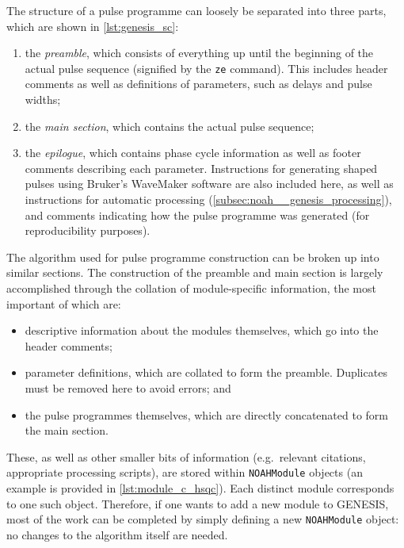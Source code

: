 The structure of a pulse programme can loosely be separated into three parts, which are shown in \cref{lst:genesis_sc}:
\begin{enumerate}
    \item the \textit{preamble}, which consists of everything up until the beginning of the actual pulse sequence (signified by the \texttt{ze} command). This includes header comments as well as definitions of parameters, such as delays and pulse widths;
    \item the \textit{main section}, which contains the actual pulse sequence;
    \item the \textit{epilogue}, which contains phase cycle information as well as footer comments describing each parameter. Instructions for generating shaped pulses using Bruker's WaveMaker software are also included here, as well as instructions for automatic processing (\cref{subsec:noah__genesis_processing}), and comments indicating how the pulse programme was generated (for reproducibility purposes).
\end{enumerate}

The algorithm used for pulse programme construction can be broken up into similar sections.
The construction of the preamble and main section is largely accomplished through the collation of module-specific information, the most important of which are:
\begin{itemize}
    \item descriptive information about the modules themselves, which go into the header comments;
    \item parameter definitions, which are collated to form the preamble. Duplicates must be removed here to avoid errors; and
    \item the pulse programmes themselves, which are directly concatenated to form the main section.
\end{itemize}
These, as well as other smaller bits of information (e.g.\ relevant citations, appropriate processing scripts), are stored within \texttt{NOAHModule} objects (an example is provided in \cref{lst:module_c_hsqc}).
Each distinct module corresponds to one such object.
Therefore, if one wants to add a new module to GENESIS, most of the work can be completed by simply defining a new \texttt{NOAHModule} object: no changes to the algorithm itself are needed.

